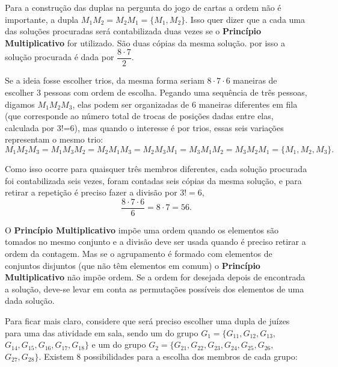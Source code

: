 Para a construção das duplas na pergunta do jogo de cartas a ordem não é importante, a dupla $M_1M_2 = M_2M_1 = \{M_1,M_{2}\}$. Isso quer dizer que a cada uma das soluções procuradas será contabilizada duas vezes se o \textbf{Princípio Multiplicativo} for utilizado. São duas cópias da mesma solução. por isso a solução procurada é dada por $\dfrac{8 \cdot 7}{2}$.

 Se a ideia fosse escolher trios, da mesma forma seriam $8\cdot 7 \cdot 6$ maneiras de escolher 3 pessoas com ordem de escolha. Pegando uma sequência de três pessoas, digamos $M_1M_2M_3$, elas podem ser organizadas de 6 maneiras diferentes em fila (que corresponde ao número total de trocas de posições dadas entre elas, calculada por 3!=6), mas quando o interesse é por trios, essas seis variações representam o mesmo trio: $M_1M_2M_3=M_1M_3M_2=M_2M_1M_3=M_2M_3M_1=M_3M_1M_2=M_3M_2M_1=\{M_1,M_{2},M_{3}\}.$
 
 Como isso  ocorre para quaisquer três membros diferentes, cada solução procurada foi contabilizada seis vezes, foram contadas seis cópias da mesma solução, e para retirar a repetição é preciso fazer a divisão por $3!=6$, $$\dfrac{8 \cdot 7 \cdot 6}{6} = 8 \cdot 7 = 56.$$

O \textbf{Princípio Multiplicativo} impõe uma ordem quando os elementos são tomados no mesmo conjunto e a divisão deve ser usada quando é preciso retirar a ordem da contagem. Mas se o agrupamento é formado com elementos de conjuntos disjuntos (que não têm elementos em comum) o \textbf{Princípio Multiplicativo} não impõe ordem. Se a ordem for desejada depois de encontrada a solução, deve-se levar em conta as permutações possíveis dos elementos de uma dada solução. 

Para ficar mais claro, considere que será preciso escolher uma dupla de juízes para uma das atividade em sala, sendo um do grupo $G_1=\{G_{11},G_{12},G_{13},$
$G_{14},G_{15},G_{16},G_{17},G_{18}\}$ e um do grupo $G_2=\{G_{21},G_{22},G_{23},
G_{24},G_{25},G_{26},$ $G_{27},G_{28}\}$. Existem 8 possibilidades para a escolha dos membros de cada grupo:


